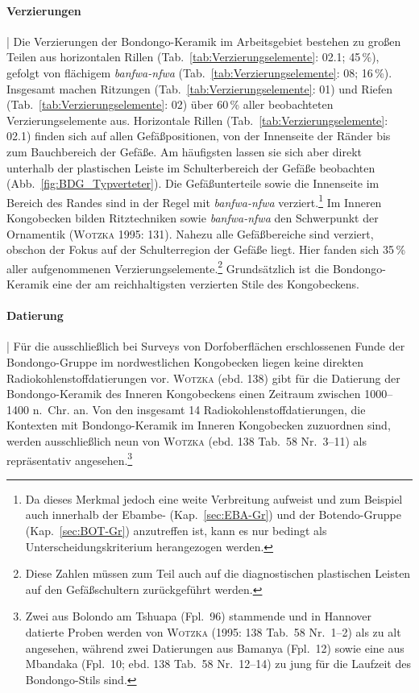 \paragraph{Verzierungen}\hspace{-.5em}|\hspace{.5em}%
Die Verzierungen der Bondongo-Keramik im Arbeitsgebiet bestehen zu großen Teilen aus horizontalen Rillen (Tab.~\ref{tab:Verzierungselemente}: 02.1; 45\,\%), gefolgt von flächigem \textit{banfwa-nfwa} (Tab.~\ref{tab:Verzierungselemente}: 08; 16\,\%). Insgesamt machen Ritzungen (Tab.~\ref{tab:Verzierungselemente}: 01) und Riefen (Tab.~\ref{tab:Verzierungselemente}: 02) über 60\,\% aller beobachteten Verzierungselemente aus. Horizontale Rillen (Tab.~\ref{tab:Verzierungselemente}: 02.1) finden sich auf allen Gefäßpositionen, von der Innenseite der Ränder bis zum Bauchbereich der Gefäße. Am häufigsten lassen sie sich aber direkt unterhalb der plastischen Leiste im Schulterbereich der Gefäße beobachten (Abb.~\ref{fig:BDG_Typverteter}). Die Gefäßunterteile sowie die Innenseite im Bereich des Randes sind in der Regel mit \textit{banfwa-nfwa} verziert.\footnote{Da dieses Merkmal jedoch eine weite Verbreitung aufweist und zum Beispiel auch innerhalb der Ebambe- (Kap.~\ref{sec:EBA-Gr}) und der Botendo-Gruppe (Kap.~\ref{sec:BOT-Gr}) anzutreffen ist, kann es nur bedingt als Unterscheidungskriterium herangezogen werden.} Im Inneren Kongobecken bilden Ritztechniken sowie \textit{banfwa-nfwa} den Schwerpunkt der Ornamentik (\textsc{Wotzka} 1995: 131). Nahezu alle Gefäßbereiche sind verziert, obschon der Fokus auf der Schulterregion der Gefäße liegt. Hier fanden sich 35\,\% aller aufgenommenen Verzierungselemente.\footnote{Diese Zahlen müssen zum Teil auch auf die diagnostischen plastischen Leisten auf den Gefäßschultern zurückgeführt werden.} Grundsätzlich ist die Bondongo-Keramik eine der am reichhaltigsten verzierten Stile des Kongobeckens.


\paragraph{Datierung}\hspace{-.5em}|\hspace{.5em}%
Für die ausschließlich bei Surveys von Dorfoberflächen erschlossenen Funde der Bondongo-Gruppe im nordwestlichen Kongobecken liegen keine direkten Radiokohlenstoffdatierungen vor. \textsc{Wotzka} (ebd. 138) gibt für die Datierung der Bondongo-Keramik des Inneren Kongobeckens einen Zeitraum zwischen 1000--1400 n.~Chr. an. Von den insgesamt 14 Radiokohlenstoffdatierungen, die Kontexten mit Bondongo-Keramik im Inneren Kongobecken zuzuordnen sind, werden ausschließlich neun von \textsc{Wotzka} (ebd. 138 Tab.~58 Nr.~3--11) als repräsentativ angesehen.\footnote{Zwei aus Bolondo am Tshuapa (Fpl.~96) stammende und in Hannover datierte Proben werden von \textsc{Wotzka} (1995: 138 Tab.~58 Nr.~1--2) als zu alt angesehen, während zwei Datierungen aus Bamanya (Fpl.~12) sowie eine aus Mbandaka (Fpl.~10; ebd. 138 Tab.~58 Nr.~12--14) zu jung für die Laufzeit des Bondongo-Stils sind.}


